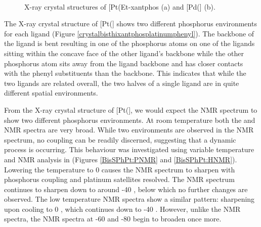 \begin{figure}[htbp]
\begin{subfigure}[b]{0.45\textwidth}
	\caption{}
	\label{PdPhxantphos2}
\end{subfigure}
\\
\caption[X-ray crystal structures of [Pt(Et-xantphos\ce{)2}{]} and [Pd(\Phxantphos\ce{)2}{]}]{X-ray crystal structures of [Pt(Et-xantphos\ce{)2}{]}\cite{Grushin2006} (a) and [Pd(\Phxantphos{}]\cite{Miedaner2004} (b).}
\label{Mdiphosphine2}
\end{figure}

The X-ray crystal structure of [Pt(\Phthixantphos{}] shows two different phosphorus environments for each \Phthixantphos{} ligand (Figure \ref{crystalbisthixantphosplatinumphenyl}).  The backbone of the \Phthixantphos{} ligand is bent resulting in one of the phosphorus atoms on one of the ligands sitting within the concave face of the other ligand's backbone while the other phosphorus atom sits away from the ligand backbone and has closer contacts with the phenyl substituents than the backbone.  This indicates that while the two ligands are related overall, the two halves of a single ligand are in quite different spatial environments.  

From the X-ray crystal structure of [Pt(\Phthixantphos{}], we would expect the \phosphorus{} NMR spectrum to show two different phosphorus environments.  At room temperature both the \proton{} and \phosphorus{} NMR spectra are very broad.  While two environments are observed in the \phosphorus{} NMR spectrum, no coupling can be readily discerned, suggesting that a dynamic process is occurring. This behaviour was investigated using variable temperature \proton{} and \phosphorus{} NMR analysis in  (Figures \ref{BisSPhPt:PNMR} and \ref{BisSPhPt:HNMR}).  Lowering the temperature to 0 \degC{} causes the \phosphorus{} NMR spectrum to sharpen with phosphorus coupling and platinum satellites resolved.  The \phosphorus{} NMR spectrum continues to sharpen down to around -40 \degC, below which no further changes are observed.  The low temperature \proton{} NMR spectra show a similar pattern: sharpening upon cooling to 0 \degC, which continues down to -40 \degC.  However, unlike the \phosphorus{} NMR spectra, the \proton{} NMR spectra at -60 and -80 \degC{} begin to broaden once more.

